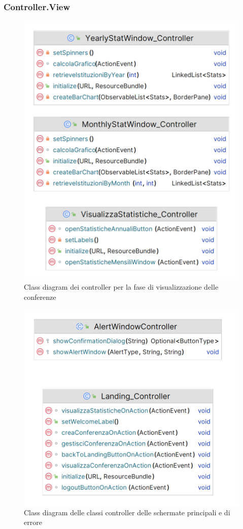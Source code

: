 \subsubsection{Controller.View}
\begin{figure}[h!]
	\centering
	\includegraphics[scale=0.25]{Immagini/Controller_Visualizzazione.png}
	\caption{Class diagram dei controller per la fase di visualizzazione delle conferenze}
\end{figure}
\begin{figure}[h!]
	\centering
	\includegraphics[scale=0.3]{Immagini/Landing_Controller.png}
	\caption{Class diagram delle classi controller delle schermate principali e di errore}
\end{figure}
\newpage
